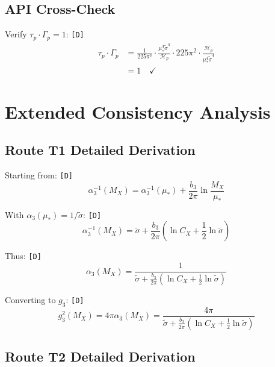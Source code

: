 \documentclass[11pt,a4paper]{article}
\newcommand{\tagD}{\textcolor{green!50!black}{\texttt{[D]}}}
\theoremstyle{definition}
\begin{document}
\subsection{API Cross-Check}
\label{app:api-check}

Verify $\tau_p \cdot \Gamma_p = 1$: \tagD{}
\begin{align}
\label{eq:app-api-1}
\tau_p \cdot \Gamma_p &= \frac{1}{225\pi^2} \cdot \frac{\mu_*^4 \tilde{\sigma}^4}{\mathcal{H}_p} \cdot 225\pi^2 \cdot \frac{\mathcal{H}_p}{\mu_*^4 \tilde{\sigma}^4} \\
\label{eq:app-api-2}
&= 1 \quad \checkmark
\end{align}

\section{Extended Consistency Analysis}
\label{app:extended-consistency}

\subsection{Route T1 Detailed Derivation}
\label{app:t1-detailed}

Starting from: \tagD{}
\begin{equation}
\label{eq:app-t1-d1}
\alpha_3^{-1}(M_X) = \alpha_3^{-1}(\mu_*) + \frac{b_3}{2\pi}\ln\frac{M_X}{\mu_*}
\end{equation}

With $\alpha_3(\mu_*) = 1/\tilde{\sigma}$: \tagD{}
\begin{equation}
\label{eq:app-t1-d2}
\alpha_3^{-1}(M_X) = \tilde{\sigma} + \frac{b_3}{2\pi}\left(\ln C_X + \frac{1}{2}\ln\tilde{\sigma}\right)
\end{equation}

Thus: \tagD{}
\begin{equation}
\label{eq:app-t1-d3}
\alpha_3(M_X) = \frac{1}{\tilde{\sigma} + \frac{b_3}{2\pi}(\ln C_X + \frac{1}{2}\ln\tilde{\sigma})}
\end{equation}

Converting to $g_3$: \tagD{}
\begin{equation}
\label{eq:app-t1-d4}
g_3^2(M_X) = 4\pi \alpha_3(M_X) = \frac{4\pi}{\tilde{\sigma} + \frac{b_3}{2\pi}(\ln C_X + \frac{1}{2}\ln\tilde{\sigma})}
\end{equation}

\subsection{Route T2 Detailed Derivation}
\label{app:t2-detailed}
\end{document}
